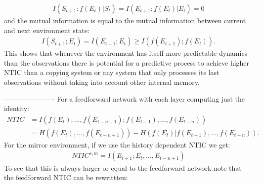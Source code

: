 \documentclass[utf8]{article}
\begin{document}
            \begin{align}
             I(S_{t+1}:f(E_t)|S_t)=I(E_{t+1}:f(E_t)|E_t)=0
            \end{align}
            and the mutual information is equal to the mutual information between current and next environment state:
            \begin{align}
                I(S_{t+1};E_t)=I(E_{t+1};E_t)\geq I(f(E_{t+1});f(E_t)).
            \end{align}
             This shows that whenever the environment has itself more predictable dynamics than the observations there is potential for a predictive process to achieve higher NTIC than a copying system or any system that only processes its last observations without taking into account other internal memory.


----------------------
            For a feedforward network with each layer computing just the identity:
            \begin{align}                NTIC&=I(f(E_t),\dots,f(E_{t-n+1});f(E_{t-1}),\dots,f(E_{t-n}))\\
            &=H(f(E_t),\dots,f(E_{t-n+1})) - H(f(E_t)|f(E_{t-1}),\dots,f(E_{t-n})).
            \end{align}
            For the mirror environment, if we use the history dependent NTIC \citep{BERTSCHINGER.2006} we get:
            \begin{align}
                NTIC^{s,m}=I(E_{t+1};E_t,\dots,E_{t-n+1})
            \end{align}
            To see that this is always larger or equal to the feedforward network note that the feedforward NTIC can be rewrittten:
\end{document}
